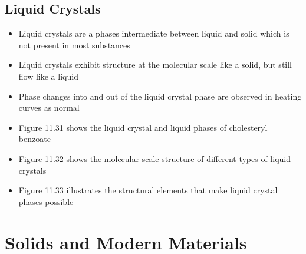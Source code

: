 \documentclass[12pt, openany, letterpaper]{memoir}
\begin{document}
\section{Liquid Crystals}
\begin{itemize}
  \item Liquid crystals are a phases intermediate between liquid and solid which is not present in most substances
  \item Liquid crystals exhibit structure at the molecular scale like a solid, but still flow like a liquid
  \item Phase changes into and out of the liquid crystal phase are observed in heating curves as normal
  \item Figure 11.31 shows the liquid crystal and liquid phases of cholesteryl benzoate
  \item Figure 11.32 shows the molecular-scale structure of different types of liquid crystals
  \item Figure 11.33 illustrates the structural elements that make liquid crystal phases possible
\end{itemize}

\chapter{Solids and Modern Materials}
\end{document}
